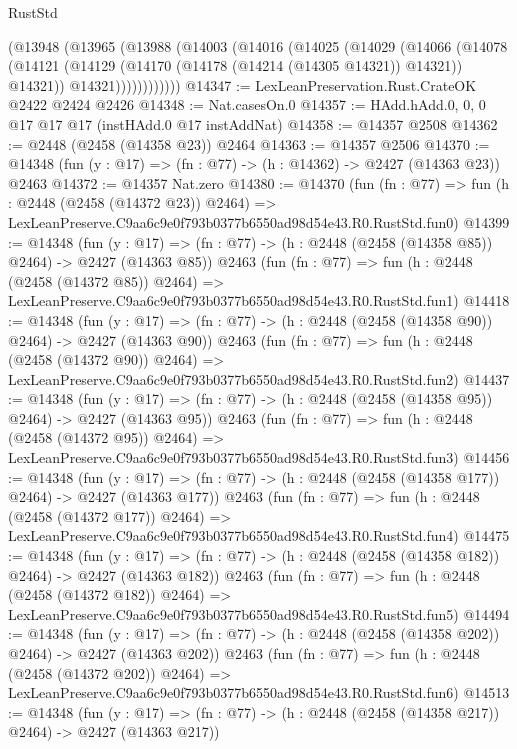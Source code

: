 \begin{lexlean}{RustStd}
\begin{coremodule}
          (@13948
            (@13965
              (@13988
                (@14003
                  (@14016
                    (@14025
                      (@14029
                        (@14066
                          (@14078
                            (@14121
                              (@14129 (@14170 (@14178 (@14214 (@14305 @14321)) @14321)) @14321))
                            @14321))))))))))))
@14347 := LexLeanPreservation.Rust.CrateOK @2422 @2424 @2426
@14348 := Nat.casesOn.{0}
@14357 := HAdd.hAdd.{0, 0, 0} @17 @17 @17 (instHAdd.{0} @17 instAddNat)
@14358 := @14357 @2508
@14362 := @2448 (@2458 (@14358 @23)) @2464
@14363 := @14357 @2506
@14370 := @14348 (fun (y : @17) => (fn : @77) -> (h : @14362) -> @2427 (@14363 @23)) @2463
@14372 := @14357 Nat.zero
@14380 := @14370
    (fun (fn : @77) =>
    fun (h : @2448 (@2458 (@14372 @23)) @2464) =>
    LexLeanPreserve.C9aa6c9e0f793b0377b6550ad98d54e43.R0.RustStd.fun0)
@14399 := @14348
    (fun (y : @17) => (fn : @77) -> (h : @2448 (@2458 (@14358 @85)) @2464) -> @2427 (@14363 @85))
    @2463
    (fun (fn : @77) =>
    fun (h : @2448 (@2458 (@14372 @85)) @2464) =>
    LexLeanPreserve.C9aa6c9e0f793b0377b6550ad98d54e43.R0.RustStd.fun1)
@14418 := @14348
    (fun (y : @17) => (fn : @77) -> (h : @2448 (@2458 (@14358 @90)) @2464) -> @2427 (@14363 @90))
    @2463
    (fun (fn : @77) =>
    fun (h : @2448 (@2458 (@14372 @90)) @2464) =>
    LexLeanPreserve.C9aa6c9e0f793b0377b6550ad98d54e43.R0.RustStd.fun2)
@14437 := @14348
    (fun (y : @17) => (fn : @77) -> (h : @2448 (@2458 (@14358 @95)) @2464) -> @2427 (@14363 @95))
    @2463
    (fun (fn : @77) =>
    fun (h : @2448 (@2458 (@14372 @95)) @2464) =>
    LexLeanPreserve.C9aa6c9e0f793b0377b6550ad98d54e43.R0.RustStd.fun3)
@14456 := @14348
    (fun (y : @17) => (fn : @77) -> (h : @2448 (@2458 (@14358 @177)) @2464) -> @2427 (@14363 @177))
    @2463
    (fun (fn : @77) =>
    fun (h : @2448 (@2458 (@14372 @177)) @2464) =>
    LexLeanPreserve.C9aa6c9e0f793b0377b6550ad98d54e43.R0.RustStd.fun4)
@14475 := @14348
    (fun (y : @17) => (fn : @77) -> (h : @2448 (@2458 (@14358 @182)) @2464) -> @2427 (@14363 @182))
    @2463
    (fun (fn : @77) =>
    fun (h : @2448 (@2458 (@14372 @182)) @2464) =>
    LexLeanPreserve.C9aa6c9e0f793b0377b6550ad98d54e43.R0.RustStd.fun5)
@14494 := @14348
    (fun (y : @17) => (fn : @77) -> (h : @2448 (@2458 (@14358 @202)) @2464) -> @2427 (@14363 @202))
    @2463
    (fun (fn : @77) =>
    fun (h : @2448 (@2458 (@14372 @202)) @2464) =>
    LexLeanPreserve.C9aa6c9e0f793b0377b6550ad98d54e43.R0.RustStd.fun6)
@14513 := @14348
    (fun (y : @17) => (fn : @77) -> (h : @2448 (@2458 (@14358 @217)) @2464) -> @2427 (@14363 @217))

\end{coremodule}
\end{lexlean}
